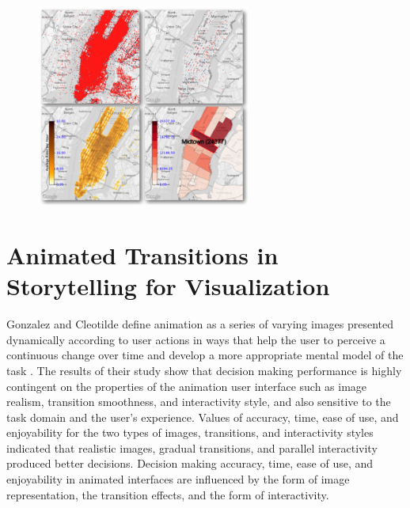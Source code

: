 \documentclass{egpubl}
\begin{document}
\begin{figure}
\begingroup
\centering
\includegraphics[width=7cm]{./images/ferreira2013}
\label{fig:ferreira2013}
\endgroup
\end{figure}


\section{Animated Transitions in Storytelling for Visualization}
Gonzalez and Cleotilde define animation as a series of varying images presented dynamically according to user actions in ways that help the user to perceive a continuous change over time and develop a more appropriate mental model of the task \cite{gonzalez1995animation}.
The results of their study show that decision making performance is highly contingent on the properties of the animation user interface such as image realism, transition smoothness, and interactivity style, and also sensitive to the task domain and the user's experience.  
Values of accuracy, time, ease of use, and enjoyability for the two types of images, transitions, and interactivity styles indicated that realistic images, gradual transitions, and parallel interactivity produced better decisions.
Decision making accuracy, time, ease of use, and enjoyability in animated interfaces are influenced by the form of image representation, the transition effects, and the form of interactivity.
\end{document}
